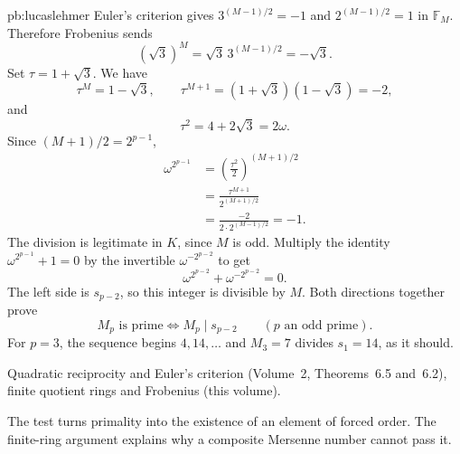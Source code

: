 \begin{solution}{pb:lucaslehmer}
Euler's criterion gives $3^{(M-1)/2}=-1$ and $2^{(M-1)/2}=1$ in $\mathbb F_M$. Therefore Frobenius sends
\[
(\sqrt3)^M=\sqrt3\,3^{(M-1)/2}=-\sqrt3.
\]
Set $\tau=1+\sqrt3$. We have
\[
\tau^M=1-\sqrt3,\qquad
\tau^{M+1}=(1+\sqrt3)(1-\sqrt3)=-2,
\]
and
\[
\tau^2=4+2\sqrt3=2\omega.
\]
Since $(M+1)/2=2^{p-1}$,
\[
\begin{aligned}
\omega^{2^{p-1}}
&=\left(\frac{\tau^2}{2}\right)^{(M+1)/2}\\
&=\frac{\tau^{M+1}}{2^{(M+1)/2}}\\
&=\frac{-2}{2\cdot2^{(M-1)/2}}=-1.
\end{aligned}
\]
The division is legitimate in $K$, since $M$ is odd. Multiply the identity
$\omega^{2^{p-1}}+1=0$ by the invertible $\omega^{-2^{p-2}}$ to get
\[
\omega^{2^{p-2}}+\omega^{-2^{p-2}}=0.
\]
The left side is $s_{p-2}$, so this integer is divisible by $M$. Both directions together prove
\[
\boxed{M_p\text{ is prime}\iff M_p\mid s_{p-2}}
\qquad(p\text{ an odd prime}).
\]
For $p=3$, the sequence begins $4,14,\ldots$ and $M_3=7$ divides $s_1=14$, as it should.

\tools Quadratic reciprocity and Euler's criterion (Volume~2, Theorems~6.5 and~6.2), finite quotient rings and Frobenius (this volume).

\leads The test turns primality into the existence of an element of forced order. The finite-ring argument explains why a composite Mersenne number cannot pass it.
\end{solution}

